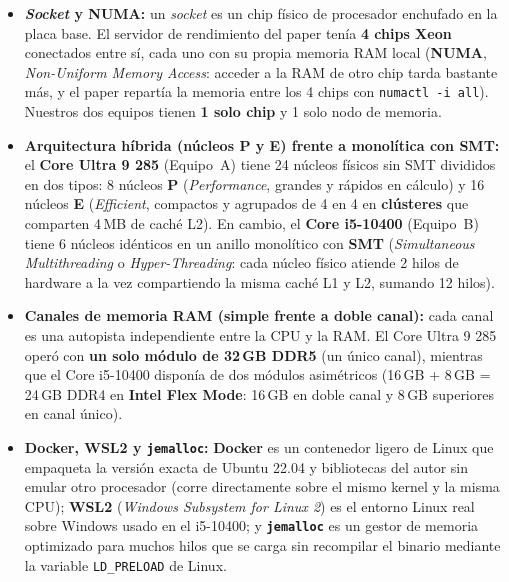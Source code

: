 \documentclass[11pt,a4paper]{article}
\begin{document}
\begin{itemize}
  \item \textbf{\emph{Socket} y NUMA:} un \emph{socket} es un chip físico de procesador enchufado en la placa base. El servidor de rendimiento del paper tenía \textbf{4 chips Xeon} conectados entre sí, cada uno con su propia memoria RAM local (\textbf{NUMA}, \emph{Non-Uniform Memory Access}: acceder a la RAM de otro chip tarda bastante más, y el paper repartía la memoria entre los 4 chips con \texttt{numactl -i all}). Nuestros dos equipos tienen \textbf{1 solo chip} y 1 solo nodo de memoria.
  \item \textbf{Arquitectura híbrida (núcleos P y E) frente a monolítica con SMT:} el \textbf{Core Ultra 9 285} (Equipo~A) tiene 24 núcleos físicos sin SMT divididos en dos tipos: 8 núcleos \textbf{P} (\emph{Performance}, grandes y rápidos en cálculo) y 16 núcleos \textbf{E} (\emph{Efficient}, compactos y agrupados de 4 en 4 en \textbf{clústeres} que comparten 4\,MB de caché L2). En cambio, el \textbf{Core i5-10400} (Equipo~B) tiene 6 núcleos idénticos en un anillo monolítico con \textbf{SMT} (\emph{Simultaneous Multithreading} o \emph{Hyper-Threading}: cada núcleo físico atiende 2 hilos de hardware a la vez compartiendo la misma caché L1 y L2, sumando 12 hilos).
  \item \textbf{Canales de memoria RAM (simple frente a doble canal):} cada canal es una autopista independiente entre la CPU y la RAM. El Core Ultra 9 285 operó con \textbf{un solo módulo de 32\,GB DDR5} (un único canal), mientras que el Core i5-10400 disponía de dos módulos asimétricos (16\,GB + 8\,GB = 24\,GB DDR4 en \textbf{Intel Flex Mode}: 16\,GB en doble canal y 8\,GB superiores en canal único).
  \item \textbf{Docker, WSL2 y \texttt{jemalloc}:} \textbf{Docker} es un contenedor ligero de Linux que empaqueta la versión exacta de Ubuntu 22.04 y bibliotecas del autor sin emular otro procesador (corre directamente sobre el mismo kernel y la misma CPU); \textbf{WSL2} (\emph{Windows Subsystem for Linux 2}) es el entorno Linux real sobre Windows usado en el i5-10400; y \textbf{\texttt{jemalloc}} es un gestor de memoria optimizado para muchos hilos que se carga sin recompilar el binario mediante la variable \texttt{LD\_PRELOAD} de Linux.
\end{itemize}
\end{document}
